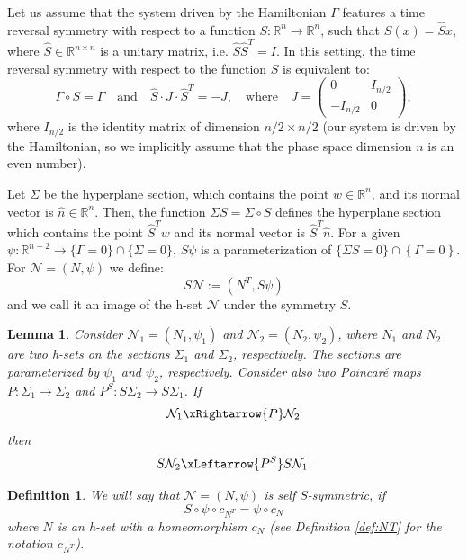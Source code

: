 \documentclass[1p]{article}
\newtheorem{definition}{Definition}
\newtheorem{lemma}{Lemma}
\begin{document}
Let us assume that the system driven by the Hamiltonian $\Gamma$ features a time reversal symmetry with respect to a function $S : \mathbb{R}^n \to \mathbb{R}^n$, such that $S(x) = \hat{S}x$, where $\hat{S} \in \mathbb{R}^{n \times n}$ is a unitary matrix, i.e. $\hat{S} \hat{S}^T = I$. In this setting, the time reversal symmetry with respect to the function $S$ is equivalent to:
\[
    \Gamma \circ S = \Gamma \quad \text{and}\quad
    \hat{S} \cdot J \cdot \hat{S}^T = -J, \quad\text{where}\quad
    J = \begin{pmatrix} 0 & I_{n/2} \\ -I_{n/2} & 0 \end{pmatrix},
\]
where $I_{n/2}$ is the identity matrix of dimension $n/2 \times n/2$ (our system is driven by the Hamiltonian, so we implicitly assume that the phase space dimension $n$ is an even number).

Let $\Sigma$ be the hyperplane section, which contains the point $w \in \mathbb{R}^n$, and its normal vector is $\hat{n} \in \mathbb{R}^n$. Then, the function $\Sigma S = \Sigma \circ S$ defines the hyperplane section which contains the point $\hat{S}^T w$ and its normal vector is $\hat{S}^T \hat{n}$. For a given $\psi:\mathbb{R}^{n-2}\to \{\Gamma =0\} \cap \{ \Sigma = 0 \}$, $S\psi$ is a parameterization of $\{ \Sigma S = 0\} \cap\left\{\Gamma=0\right\}.$ For $\mathcal{N} = (N,\psi)$ we define:
\[
    S\mathcal{N} := (N^T, S\psi)
\]
and we call it an image of the h-set $\mathcal{N}$ under the symmetry $S$.

\begin{lemma}
    \label{lem:S_backsymmetry}
    Consider  $\mathcal{N}_1 = (N_1, \psi_1)$ and $\mathcal{N}_2 = (N_2, \psi_2)$, where $N_1$ and $N_2$ are two h-sets on the sections $\Sigma_{1}$ and $\Sigma_{2}$, respectively. The sections are parameterized by $\psi_1$ and $\psi_2$, respectively. Consider also two Poincar\'e maps $P:\Sigma_{1}\rightarrow\Sigma_{2}$ and $P^{S}:S\Sigma_{2}\rightarrow S\Sigma_{1}$. If
    \begin{equation}
        \label{eq:Poinc-cover}
        \mathcal{N}_1 \xRightarrow{P} \mathcal{N}_2
    \end{equation}
    then
    \begin{equation}
        \label{eq:symmetry-back-covering}
        S \mathcal{N}_2 \xLeftarrow{P^S} S \mathcal{N}_1.
    \end{equation}
\end{lemma}

\begin{definition}
    \label{def:self-S-symmetry}
    We will say that $\mathcal{N} = (N,\psi)$ is self $S$-symmetric, if
    \[
        S \circ \psi \circ c_{N^T}=\psi \circ c_N
    \]
    where $N$ is an h-set with a homeomorphism $c_N$ (see Definition \ref{def:NT} for the notation $c_{N^T}$).
\end{definition}
\end{document}
